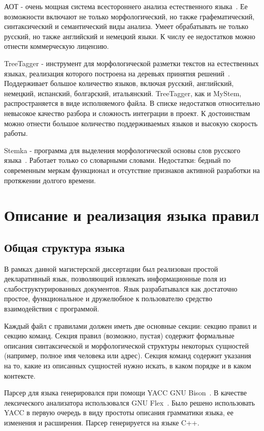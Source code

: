 АОТ - очень мощная система всестороннего анализа естественного языка~\autocite{aot}. Ее возможности включают не только морфологический, но также графематический, синтаксический и семантический виды анализа. Умеет обрабатывать не только русский, но также английский и немецкий языки. К числу ее недостатков можно отнести коммерческую лицензию.

TreeTagger - инструмент для морфологической разметки текстов на естественных языках, реализация которого построена на деревьях принятия решений~\autocite{tree-tagger}. Поддерживает большое количество языков, включая русский, английский, немецкий, испанский, болгарский, итальянский. TreeTagger, как и MyStem, распространяется в виде исполняемого файла. В списке недостатков относительно невысокое качество разбора и сложность интеграции в проект. К достоинствам можно отнести большое количество поддерживаемых языков и высокую скорость работы.

Stemka - программа для выделения морфологической основы слов русского языка~\autocite{stemka}. Работает только со словарными словами. Недостатки: бедный по современным меркам функционал и отсутствие признаков активной разработки на протяжении долгого времени.

\section{Описание и реализация языка правил}
\subsection{Общая структура языка}
В рамках данной магистерской диссертации был реализован простой декларативный язык, позволяющий извлекать информационные поля из слабоструктурированных документов. Язык разрабатывался как достаточно простое, функциональное и дружелюбное к пользователю средство взаимодействия с программой.

Каждый файл с правилами должен иметь две основные секции: секцию правил и секцию команд. Секция правил (возможно, пустая) содержит формальные описания синтаксической и морфологической структуры некоторых сущностей (например, полное имя человека или адрес). Секция команд содержит указания на то, какие из описанных сущностей нужно искать, в каком порядке и в каком контексте.

Парсер для языка генерировался при помощи YACC GNU Bison~\autocite{bison-home}. В качестве лексического анализатора использовался GNU Flex~\autocite{flex-home}. Было решено использовать YACC в первую очередь в виду простоты описания грамматики языка, ее изменения и расширения. Парсер генерируется на языке C++.

